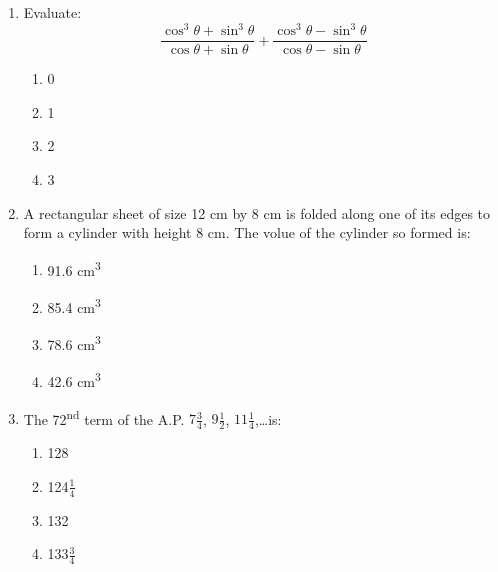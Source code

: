 \begin{enumerate}[label=(\roman*)]

    \item Evaluate:
        \[
            \frac{\cos^3 \theta + \sin^3 \theta}{\cos \theta + \sin \theta} +
            \frac{\cos^3 \theta - \sin^3 \theta}{\cos \theta - \sin \theta} 
        \]

        \begin{multicols}{2}
        \begin{enumerate}[label=(\alph*)]
            \item 0 
            \item 1 
            \item 2 
            \item 3 
        \end{enumerate}
        \end{multicols}

    \newpage
    \item A rectangular sheet of size 12 cm by 8 cm is folded along 
        one of its edges to form a cylinder with height 8 cm. The 
        volue of the cylinder so formed is:

        \begin{multicols}{2}
        \begin{enumerate}[label=(\alph*)]
            \item 91.6 cm\textsuperscript{3}
            \item 85.4 cm\textsuperscript{3}
            \item 78.6 cm\textsuperscript{3}
            \item 42.6 cm\textsuperscript{3}
        \end{enumerate}
        \end{multicols}

    \item The 72\textsuperscript{nd} term of the A.P. 
        $7\frac34$, $9\frac12$, $11\frac14$,\dots is:

        \begin{multicols}{2}
        \begin{enumerate}[label=(\alph*)]
            \item 128 
            \item 124$\frac14$ 
            \item 132 
            \item 133$\frac34$ 
        \end{enumerate}
        \end{multicols}


\end{enumerate}
